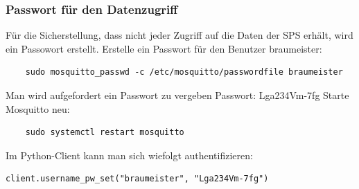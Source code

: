 \subsubsection{Passwort für den Datenzugriff}
Für die Sicherstellung, dass nicht jeder Zugriff auf die Daten der SPS erhält, wird ein Passowort erstellt.
\newline 
Erstelle ein Passwort für den Benutzer braumeister:
\begin{lstlisting}
    sudo mosquitto_passwd -c /etc/mosquitto/passwordfile braumeister
\end{lstlisting}
Man wird aufgefordert ein Passwort zu vergeben
\newline 
Passwort: Lga234Vm-7fg
\newline 
Starte Mosquitto neu:
\begin{lstlisting}
    sudo systemctl restart mosquitto
\end{lstlisting}
Im Python-Client kann man sich wiefolgt authentifizieren:
\begin{lstlisting}
client.username_pw_set("braumeister", "Lga234Vm-7fg")
\end{lstlisting}